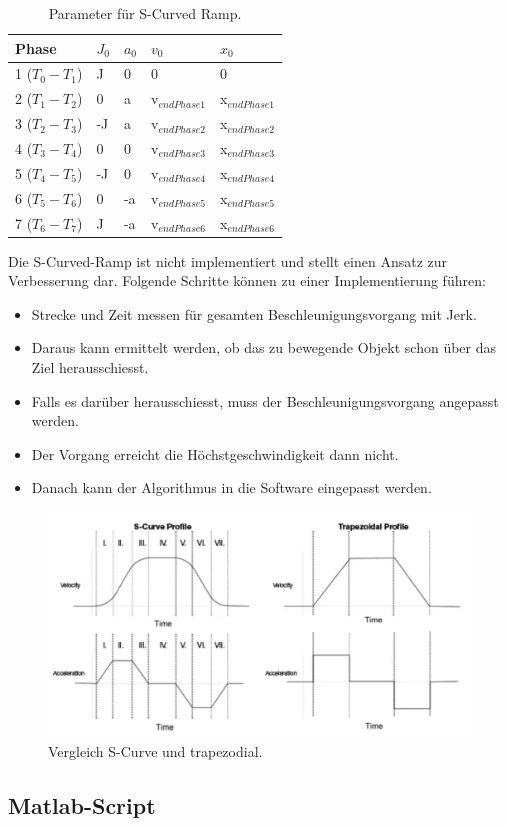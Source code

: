 \begin{table}[H]
\center
\begin{tabular}{|l|l|l|l|l|}
\hline
Phase 				& 	$J_0$		& $a_0$ 			& $v_0$ 				& $x_0$ 				\\
\hline
1 ($T_0 - T_1$)		&	J			& 0				& 0					& 0					\\
\hline
2 ($T_1 - T_2$)		&	0			& a				& v$_{end Phase1}$	& x$_{end Phase1}$	\\
\hline
3 ($T_2 - T_3$)		&	-J			& a				& v$_{end Phase2}$	& x$_{end Phase2}$	\\
\hline
4 ($T_3 - T_4$)		&	0			& 0 				& v$_{end Phase3}$	& x$_{end Phase3}$	\\
\hline
5 ($T_4 - T_5$)		&	-J			& 0 				& v$_{end Phase4}$	& x$_{end Phase4}$	\\
\hline
6 ($T_5 - T_6$)		&	0			& -a				& v$_{end Phase5}$	& x$_{end Phase5}$	\\
\hline
7 ($T_6 - T_7$)		&	J			& -a				& v$_{end Phase6}$	& x$_{end Phase6}$	\\
\hline
\end{tabular}
\caption{Parameter für S-Curved Ramp.}
\end{table}

Die S-Curved-Ramp ist nicht implementiert und stellt einen Ansatz zur Verbesserung dar. Folgende Schritte können zu einer Implementierung führen:
\begin{itemize}
\item Strecke und Zeit messen für gesamten Beschleunigungsvorgang mit Jerk.
\item Daraus kann ermittelt werden, ob das zu bewegende Objekt schon über das Ziel herausschiesst.
\item Falls es darüber herausschiesst, muss der Beschleunigungsvorgang angepasst werden.
\item Der Vorgang erreicht die Höchstgeschwindigkeit dann nicht.
\item Danach kann der Algorithmus in die Software eingepasst werden.
\end{itemize}

\begin{figure}[H]
\center
\includegraphics[width = \textwidth]{graphics/S_Curve_vs_trapezodial}
\caption{Vergleich S-Curve und trapezodial. \cite{lewin_s-curve_nodate}}
\label{fig:S_Curved_Ramp}
\end{figure}


\subsection{Matlab-Script}\label{Appendix:Ramp_Matlab_Script}




